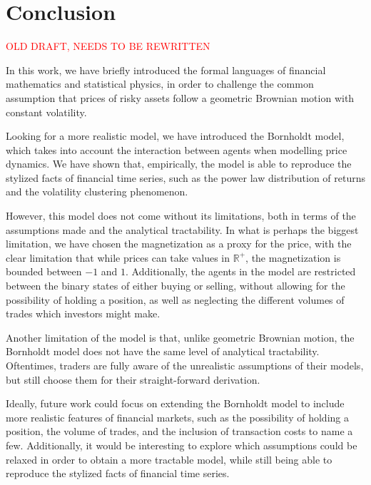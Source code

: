 \chapter{Conclusion}\label{ch:conclusion}
\textcolor{red}{OLD DRAFT, NEEDS TO BE REWRITTEN}


In this work, we have briefly introduced the formal languages of financial mathematics and statistical physics, in order to challenge the common assumption that prices of risky assets follow a geometric Brownian motion with constant volatility.

Looking for a more realistic model, we have introduced the Bornholdt model, which takes into account the interaction between agents when modelling price dynamics. We have shown that, empirically, the model is able to reproduce the stylized facts of financial time series, such as the power law distribution of returns and the volatility clustering phenomenon.

However, this model does not come without its limitations, both in terms of the assumptions made and the analytical tractability. In what is perhaps the biggest limitation, we have chosen the magnetization as a proxy for the price, with the clear limitation that while prices can take values in \(\mathbb{R}^+\), the magnetization is bounded between \(-1\) and \(1\). Additionally, the agents in the model are restricted between the binary states of either buying or selling, without allowing for the possibility of holding a position, as well as neglecting the different volumes of trades which investors might make.

Another limitation of the model is that, unlike geometric Brownian motion, the Bornholdt model does not have the same level of analytical tractability. Oftentimes, traders are fully aware of the unrealistic assumptions of their models, but still choose them for their straight-forward derivation.

Ideally, future work could focus on extending the Bornholdt model to include more realistic features of financial markets, such as the possibility of holding a position, the volume of trades, and the inclusion of transaction costs to name a few. Additionally, it would be interesting to explore which assumptions could be relaxed in order to obtain a more tractable model, while still being able to reproduce the stylized facts of financial time series.